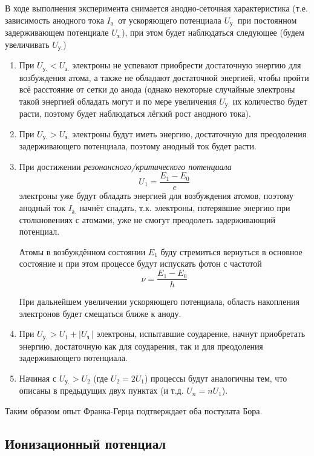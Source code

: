\documentclass[a4paper]{article}
\begin{document}
В ходе выполнения эксперимента снимается анодно-сеточная характеристика
(т.е. зависимость анодного тока $I_\text{а.}$ от ускоряющего потенциала $U_\text{у.}$
при постоянном задерживающем потенциале $U_\text{з.}$),
при этом будет наблюдаться следующее (будем увеличивать $U_\text{у.}$)
\begin{enumerate}
    \item При $U_\text{у.} < U_\text{з.}$ электроны не успевают приобрести достаточную энергию для возбуждения атома,
    а также не обладают достаточной энергией, чтобы пройти всё расстояние от сетки до анода
    (однако некоторые случайные электроны такой энергией обладать могут и по мере увеличения
    $U_\text{у.}$ их количество будет расти, поэтому будет наблюдаться лёгкий рост анодного тока).
    \item При $U_\text{у.} > U_\text{з.}$ электроны будут иметь энергию,
    достаточную для преодоления задерживающего потенциала, поэтому анодный ток будет расти.
    \item При достижении {\it резонансного/критического потенциала}
    $$
        U_1 = \dfrac{E_1 - E_0}{e}
    $$
    электроны уже будут обладать энергией для возбуждения атомов, поэтому анодный ток $I_\text{а.}$
    начнёт спадать, т.к. электроны, потерявшие энергию при столкновениях с атомами,
    уже не смогут преодолеть задерживающий потенциал.

    Атомы в возбуждённом состоянии $E_1$ буду стремиться вернуться в основное состояние
    и при этом процессе будут испускать фотон с частотой
    $$
        \nu = \dfrac{E_1 - E_0}{h}
    $$

    При дальнейшем увеличении ускоряющего потенциала,
    область накопления электронов будет смещаться ближе к аноду.
    \item При $U_\text{у.} > U_1 + |U_\text{з.}|$ электроны,
    испытавшие соударение, начнут приобретать энергию, достаточную как для соударения,
    так и для преодоления задерживающего потенциала.
    \item Начиная с $U_\text{у.} > U_2$ (где $U_2 = 2U_1$) процессы будут аналогичны тем,
    что описаны в предыдущих двух пунктах (и т.д. $U_n = nU_1$).
\end{enumerate}
Таким образом опыт Франка-Герца подтверждает оба постулата Бора.

\subsection*{Ионизационный потенциал}
\end{document}
